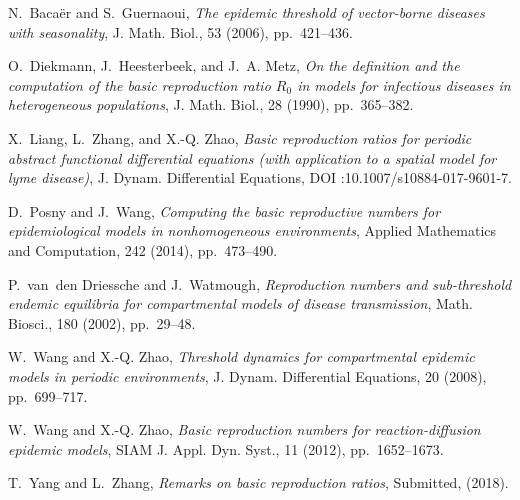 \documentclass[12pt,reqno]{article}
\begin{document}
\begin{thebibliography}{1}
	
	{\sc N.~Baca{\"e}r and S.~Guernaoui}, {\em The epidemic threshold of
		vector-borne diseases with seasonality}, J. Math. Biol., 53 (2006),
	pp.~421--436.
	
	{\sc O.~Diekmann, J.~Heesterbeek, and J.~A. Metz}, {\em On the definition and
		the computation of the basic reproduction ratio {$R_0$} in models for
		infectious diseases in heterogeneous populations}, J. Math. Biol., 28 (1990),
	pp.~365--382.
	
	{\sc X.~Liang, L.~Zhang, and X.-Q. Zhao}, {\em Basic reproduction ratios for
		periodic abstract functional differential equations (with application to a
		spatial model for lyme disease)}, J. Dynam. Differential Equations, DOI
	:10.1007/s10884-017-9601-7.
	
	{\sc D.~Posny and J.~Wang}, {\em Computing the basic reproductive numbers for
		epidemiological models in nonhomogeneous environments}, Applied Mathematics
	and Computation, 242 (2014), pp.~473--490.
	
	{\sc P.~van~den Driessche and J.~Watmough}, {\em Reproduction numbers and
		sub-threshold endemic equilibria for compartmental models of disease
		transmission}, Math. Biosci., 180 (2002), pp.~29--48.
	
	{\sc W.~Wang and X.-Q. Zhao}, {\em Threshold dynamics for compartmental
		epidemic models in periodic environments}, J. Dynam. Differential Equations,
	20 (2008), pp.~699--717.
	
	{\sc W.~Wang and X.-Q. Zhao}, {\em Basic reproduction numbers for
		reaction-diffusion epidemic models}, SIAM J. Appl. Dyn. Syst., 11 (2012),
	pp.~1652--1673.
	
	{\sc T.~Yang and L.~Zhang}, {\em Remarks on basic reproduction ratios},
	Submitted,  (2018).
	
\end{thebibliography}
\end{document}
